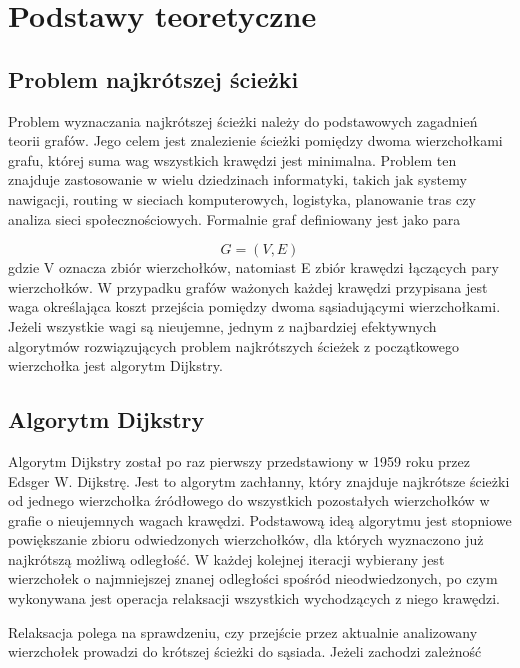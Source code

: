 \chapter{Podstawy teoretyczne}
\section{Problem najkrótszej ścieżki}

Problem wyznaczania najkrótszej ścieżki należy do podstawowych zagadnień teorii grafów. Jego celem jest znalezienie ścieżki pomiędzy dwoma wierzchołkami grafu, której suma wag wszystkich krawędzi jest minimalna. Problem ten znajduje zastosowanie w wielu dziedzinach informatyki, takich jak systemy nawigacji, routing w sieciach komputerowych, logistyka, planowanie tras czy analiza sieci społecznościowych. Formalnie graf definiowany jest jako para \cite[s.~2]{diestel2017}

\begin{equation}
\label{eq:graph}
G = (V, E)
\end{equation}
gdzie V oznacza zbiór wierzchołków, natomiast E zbiór krawędzi łączących pary wierzchołków. W przypadku grafów ważonych każdej krawędzi przypisana jest waga określająca koszt przejścia pomiędzy dwoma sąsiadującymi wierzchołkami. Jeżeli wszystkie wagi są nieujemne, jednym z najbardziej efektywnych algorytmów rozwiązujących problem najkrótszych ścieżek z początkowego wierzchołka jest algorytm Dijkstry.
\newpage

\section{Algorytm Dijkstry}

Algorytm Dijkstry \cite{dijkstra} został po raz pierwszy przedstawiony w 1959 roku przez Edsger W. Dijkstrę. Jest to algorytm zachłanny, który znajduje najkrótsze ścieżki od jednego wierzchołka źródłowego do wszystkich pozostałych wierzchołków w grafie o nieujemnych wagach krawędzi. Podstawową ideą algorytmu jest stopniowe powiększanie zbioru odwiedzonych wierzchołków, dla których wyznaczono już najkrótszą możliwą odległość. W każdej kolejnej iteracji wybierany jest wierzchołek o najmniejszej znanej odległości spośród nieodwiedzonych, po czym wykonywana jest operacja relaksacji wszystkich wychodzących z niego krawędzi.

Relaksacja polega na sprawdzeniu, czy przejście przez aktualnie analizowany wierzchołek prowadzi do krótszej ścieżki do sąsiada. Jeżeli zachodzi zależność \cite[s.~649]{cormen}


